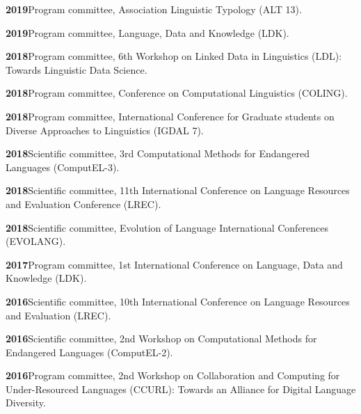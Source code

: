 \documentclass[11pt]{article}
\newcommand{\hangpara}{
 \setlength{\parindent}{0in} %
 \hangindent=0.42in %
}
\begin{document}
\vskip 6pt
\hangpara
{\bf 2019}\hspace{1ex}Program committee, Association Linguistic Typology (ALT 13).

\vskip 6pt
\hangpara
{\bf 2019}\hspace{1ex}Program committee, Language, Data and Knowledge (LDK).

\vskip 6pt
\hangpara
{\bf 2018}\hspace{1ex}Program committee, 6th Workshop on Linked Data in Linguistics (LDL): Towards Linguistic Data Science.

\vskip 6pt
\hangpara
{\bf 2018}\hspace{1ex}Program committee, Conference on Computational Linguistics (COLING).

\vskip 6pt
\hangpara
{\bf 2018}\hspace{1ex}Program committee, International Conference for Graduate students on Diverse Approaches to Linguistics (IGDAL 7).

\vskip 6pt
\hangpara
{\bf 2018}\hspace{1ex}Scientific committee, 3rd Computational Methods for Endangered Languages (ComputEL-3).

\vskip 6pt
\hangpara
{\bf 2018}\hspace{1ex}Scientific committee, 11th International Conference on Language Resources and Evaluation Conference (LREC).

\vskip 6pt
\hangpara
{\bf 2018}\hspace{1ex}Scientific committee, Evolution of Language International Conferences (EVOLANG).

\vskip 6pt
\hangpara
{\bf 2017}\hspace{1ex}Program committee, 1st International Conference on Language, Data and Knowledge (LDK).

\vskip 6pt
\hangpara
{\bf 2016}\hspace{1ex}Scientific committee, 10th International Conference on Language Resources and Evaluation (LREC).

\vskip 6pt
\hangpara
{\bf 2016}\hspace{1ex}Scientific committee, 2nd Workshop on Computational Methods for Endangered Languages (ComputEL-2).

\vskip 6pt
\hangpara
{\bf 2016}\hspace{1ex}Program committee, 2nd Workshop on Collaboration and Computing for Under-Resourced Languages (CCURL): Towards an Alliance for Digital Language Diversity.
\end{document}
